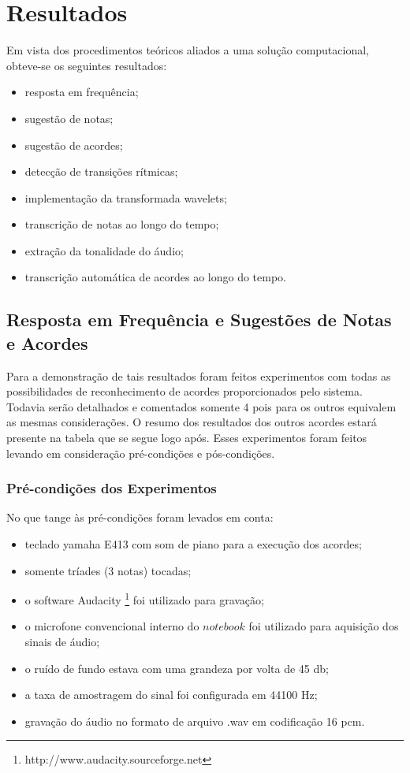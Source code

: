 \chapter{Resultados}
\label{chap:resultados}

Em vista dos procedimentos teóricos aliados a uma solução computacional, obteve-se os seguintes resultados:
\begin{itemize}
    \item resposta em frequência;
    \item sugestão de notas;
    \item sugestão de acordes;
    \item detecção de transições rítmicas;
    \item implementação da transformada wavelets;
    \item transcrição de notas ao longo do tempo;
    \item extração da tonalidade do áudio;
    \item transcrição automática de acordes ao longo do tempo.
\end{itemize}


\section{Resposta em Frequência e Sugestões de Notas e Acordes}

Para a demonstração de tais resultados foram feitos experimentos com todas as possibilidades de reconhecimento de acordes proporcionados pelo sistema. Todavia serão detalhados e comentados somente 4 pois para os outros equivalem as mesmas considerações. O resumo dos resultados dos outros acordes estará presente na tabela que se segue logo após. Esses experimentos foram feitos levando em consideração pré-condições e pós-condições.
\newpage

\subsection{Pré-condições dos Experimentos}
\label{sec:precondicoes}

No que tange às pré-condições foram levados em conta:
\begin{itemize}
    \item teclado yamaha E413 com som de piano para a execução dos acordes;
    \item somente tríades (3 notas) tocadas;
    \item o software Audacity \footnote{http://www.audacity.sourceforge.net} foi utilizado para gravação;
    \item o microfone convencional interno do $notebook$ foi utilizado para aquisição dos sinais de áudio;
    \item o ruído de fundo estava com uma grandeza por volta de 45 db;
    \item a taxa de amostragem do sinal foi configurada em 44100 Hz;
    \item gravação do áudio no formato de arquivo .wav em codificação 16 pcm.
\end{itemize}

